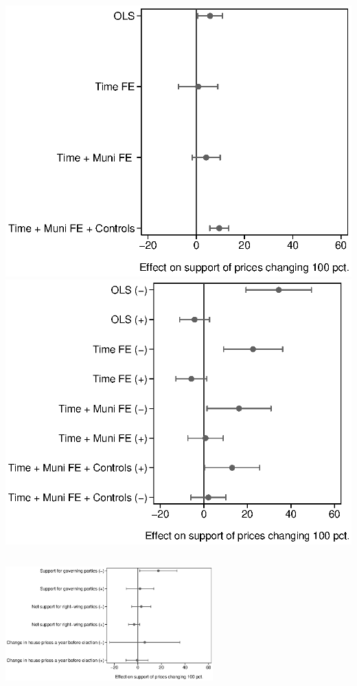 \documentclass[aspectratio=169]{beamer}
\begin{document}
\begin{frame}
	\begin{columns}
		\includegraphics[width=1\textwidth]{../../figures/pooled_effects.eps} 
     \pause
		\includegraphics[width=1\textwidth]{../../figures/posneg_effects.eps}
		\end{columns} 		\pause
		
\end{frame}	

\begin{frame}
	\begin{center}
			\includegraphics[width=0.6\textwidth]{../../figures/robust.eps}
	\end{center}
\end{frame}	
\end{document}
